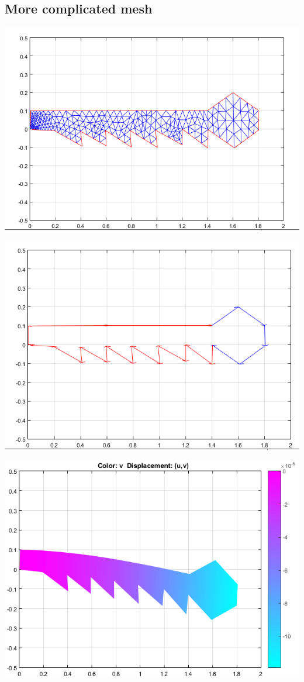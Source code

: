 \documentclass[a4paper,12pt]{article}
\begin{document}
\subsection{More complicated mesh}
\centerline{\includegraphics[scale=0.7]{myMesh}}
\centerline{\includegraphics[scale=0.7]{myForces}}
\centerline{\includegraphics[scale=0.7]{myResult}}
\end{document}
